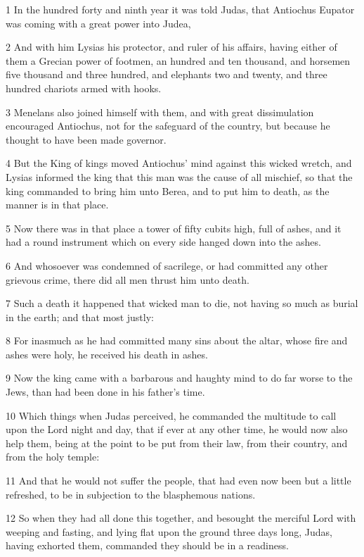 \par 1 In the hundred forty and ninth year it was told Judas, that Antiochus Eupator was coming with a great power into Judea,
\par 2 And with him Lysias his protector, and ruler of his affairs, having either of them a Grecian power of footmen, an hundred and ten thousand, and horsemen five thousand and three hundred, and elephants two and twenty, and three hundred chariots armed with hooks.
\par 3 Menelans also joined himself with them, and with great dissimulation encouraged Antiochus, not for the safeguard of the country, but because he thought to have been made governor.
\par 4 But the King of kings moved Antiochus' mind against this wicked wretch, and Lysias informed the king that this man was the cause of all mischief, so that the king commanded to bring him unto Berea, and to put him to death, as the manner is in that place.
\par 5 Now there was in that place a tower of fifty cubits high, full of ashes, and it had a round instrument which on every side hanged down into the ashes.
\par 6 And whosoever was condemned of sacrilege, or had committed any other grievous crime, there did all men thrust him unto death.
\par 7 Such a death it happened that wicked man to die, not having so much as burial in the earth; and that most justly:
\par 8 For inasmuch as he had committed many sins about the altar, whose fire and ashes were holy, he received his death in ashes.
\par 9 Now the king came with a barbarous and haughty mind to do far worse to the Jews, than had been done in his father's time.
\par 10 Which things when Judas perceived, he commanded the multitude to call upon the Lord night and day, that if ever at any other time, he would now also help them, being at the point to be put from their law, from their country, and from the holy temple:
\par 11 And that he would not suffer the people, that had even now been but a little refreshed, to be in subjection to the blasphemous nations.
\par 12 So when they had all done this together, and besought the merciful Lord with weeping and fasting, and lying flat upon the ground three days long, Judas, having exhorted them, commanded they should be in a readiness.
